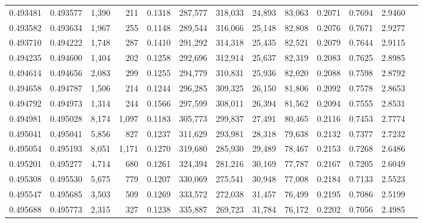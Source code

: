 \begin{tabular}{rrrrrrrrrrrrr}
0.493481 & 0.493577 & 1,390 &   211 &                                     0.1318 & 287,577 & 318,033 &  24,893 &  83,063 & 0.2071 & 0.7694 & 2.9460 \\
0.493582 & 0.493634 & 1,967 &   255 &                                     0.1148 & 289,544 & 316,066 &  25,148 &  82,808 & 0.2076 & 0.7671 & 2.9277 \\
0.493710 & 0.494222 & 1,748 &   287 &                                     0.1410 & 291,292 & 314,318 &  25,435 &  82,521 & 0.2079 & 0.7644 & 2.9115 \\
0.494235 & 0.494600 & 1,404 &   202 &                                     0.1258 & 292,696 & 312,914 &  25,637 &  82,319 & 0.2083 & 0.7625 & 2.8985 \\
0.494614 & 0.494656 & 2,083 &   299 &                                     0.1255 & 294,779 & 310,831 &  25,936 &  82,020 & 0.2088 & 0.7598 & 2.8792 \\
0.494658 & 0.494787 & 1,506 &   214 &                                     0.1244 & 296,285 & 309,325 &  26,150 &  81,806 & 0.2092 & 0.7578 & 2.8653 \\
0.494792 & 0.494973 & 1,314 &   244 &                                     0.1566 & 297,599 & 308,011 &  26,394 &  81,562 & 0.2094 & 0.7555 & 2.8531 \\
0.494981 & 0.495028 & 8,174 & 1,097 &                                     0.1183 & 305,773 & 299,837 &  27,491 &  80,465 & 0.2116 & 0.7453 & 2.7774 \\
0.495041 & 0.495041 & 5,856 &   827 &                                     0.1237 & 311,629 & 293,981 &  28,318 &  79,638 & 0.2132 & 0.7377 & 2.7232 \\
0.495054 & 0.495193 & 8,051 & 1,171 &                                     0.1270 & 319,680 & 285,930 &  29,489 &  78,467 & 0.2153 & 0.7268 & 2.6486 \\
0.495201 & 0.495277 & 4,714 &   680 &                                     0.1261 & 324,394 & 281,216 &  30,169 &  77,787 & 0.2167 & 0.7205 & 2.6049 \\
0.495308 & 0.495530 & 5,675 &   779 &                                     0.1207 & 330,069 & 275,541 &  30,948 &  77,008 & 0.2184 & 0.7133 & 2.5523 \\
0.495547 & 0.495685 & 3,503 &   509 &                                     0.1269 & 333,572 & 272,038 &  31,457 &  76,499 & 0.2195 & 0.7086 & 2.5199 \\
0.495688 & 0.495773 & 2,315 &   327 &                                     0.1238 & 335,887 & 269,723 &  31,784 &  76,172 & 0.2202 & 0.7056 & 2.4985 \\

\end{tabular}
